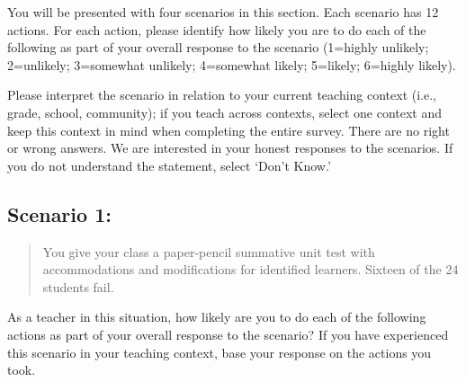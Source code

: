 \documentclass[
]{book}
\begin{document}
You will be presented with four scenarios in this section. Each scenario has 12 actions. For each action, please identify how likely you are to do each of the following as part of your overall response to the scenario (1=highly unlikely; 2=unlikely; 3=somewhat unlikely; 4=somewhat likely; 5=likely; 6=highly likely).

Please interpret the scenario in relation to your current teaching context (i.e., grade, school, community); if you teach across contexts, select one context and keep this context in mind when completing the entire survey. There are no right or wrong answers. We are interested in your honest responses to the scenarios. If you do not understand the statement, select `Don't Know.'

\hypertarget{scenario-1-1}{%
\subsection{Scenario 1:}\label{scenario-1-1}}

\begin{quote}
You give your class a paper-pencil summative unit test with accommodations and modifications for identified learners. Sixteen of the 24 students fail.
\end{quote}

As a teacher in this situation, how likely are you to do each of the following actions as part of your overall response to the scenario? If you have experienced this scenario in your teaching context, base your response on the actions you took.
\end{document}
